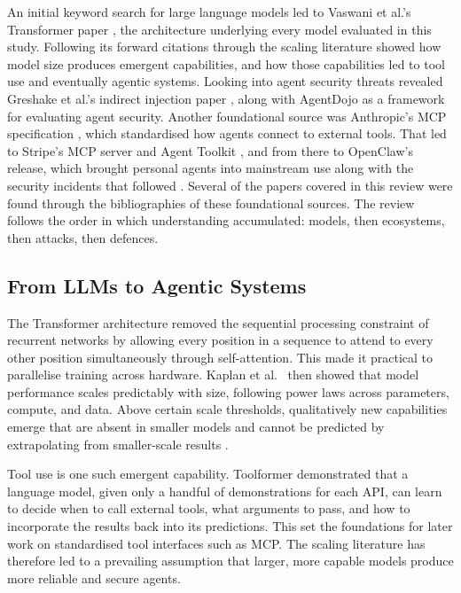 \documentclass[conference]{IEEEtran}
\begin{document}
An initial keyword search for large language models led to Vaswani et al.'s Transformer
paper \cite{vaswani2017attention}, the architecture underlying every model evaluated in
this study. Following its forward citations through the scaling literature showed how
model size produces emergent capabilities, and how those capabilities led to tool use and
eventually agentic systems. Looking into agent security threats revealed Greshake et al.'s
indirect injection paper \cite{greshake2023indirect}, along with AgentDojo
\cite{agentdojo} as a framework for evaluating agent security. Another foundational source
was Anthropic's MCP specification \cite{anthropic_mcp_2024}, which standardised how agents
connect to external tools. That led to Stripe's MCP server and Agent Toolkit
\cite{stripe_mcp_2025}, and from there to OpenClaw's release, which brought personal
agents into mainstream use along with the security incidents that followed
\cite{clawhavoc_2026, cve_2026_30856}. Several of the papers covered in this review were
found through the bibliographies of these foundational sources. The review follows the
order in which understanding accumulated: models, then ecosystems, then attacks, then
defences.

\subsection{From LLMs to Agentic Systems}

The Transformer architecture \cite{vaswani2017attention} removed the sequential processing
constraint of recurrent networks by allowing every position in a sequence to attend to
every other position simultaneously through self-attention. This made it practical to
parallelise training across hardware. Kaplan et al.\ \cite{kaplan2020scaling}
then showed that model performance scales predictably with size, following power laws
across parameters, compute, and data. Above certain scale thresholds, qualitatively new
capabilities emerge that are absent in smaller models and cannot be predicted by
extrapolating from smaller-scale results \cite{wei2022emergent}.

Tool use is one such emergent capability. Toolformer \cite{schick2023toolformer}
demonstrated that a language model, given only a handful of demonstrations for each API,
can learn to decide when to call external tools, what arguments to pass, and how to
incorporate the results back into its predictions. This set the foundations for later work
on standardised tool interfaces such as MCP. The scaling literature has therefore led to a
prevailing assumption that larger, more capable models produce more reliable and secure
agents.
\end{document}
